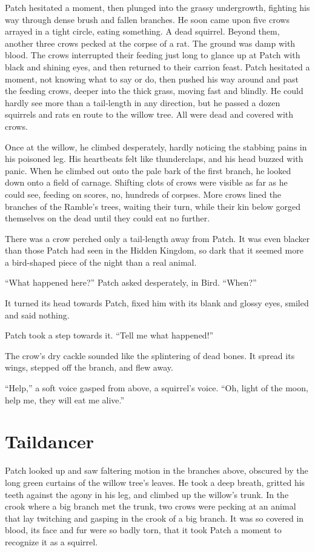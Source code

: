 \documentclass[ebook,oneside,openany,12pt]{memoir}
\begin{document}
Patch hesitated a moment, then plunged into the grassy undergrowth,
fighting his way through dense brush and fallen branches. He soon came
upon five crows arrayed in a tight circle, eating something. A dead
squirrel. Beyond them, another three crows pecked at the corpse of a
rat. The ground was damp with blood. The crows interrupted their
feeding just long to glance up at Patch with black and shining eyes,
and then returned to their carrion feast. Patch hesitated a moment,
not knowing what to say or do, then pushed his way around and past the
feeding crows, deeper into the thick grass, moving fast and
blindly. He could hardly see more than a tail-length in any direction,
but he passed a dozen squirrels and rats en route to the willow
tree. All were dead and covered with crows.

Once at the willow, he climbed desperately, hardly noticing the
stabbing pains in his poisoned leg. His heartbeats felt like
thunderclaps, and his head buzzed with panic. When he climbed out onto
the pale bark of the first branch, he looked down onto a field of
carnage. Shifting clots of crows were visible as far as he could see,
feeding on scores, no, hundreds of corpses. More crows lined the
branches of the Ramble’s trees, waiting their turn, while their kin
below gorged themselves on the dead until they could eat no further.

There was a crow perched only a tail-length away from Patch. It was
even blacker than those Patch had seen in the Hidden Kingdom, so dark
that it seemed more a bird-shaped piece of the night than a real
animal.

“What happened here?” Patch asked desperately, in Bird. “When?”

It turned its head towards Patch, fixed him with its blank and glossy
eyes, smiled and said nothing.

Patch took a step towards it. “Tell me what happened!”

The crow’s dry cackle sounded like the splintering of dead bones. It
spread its wings, stepped off the branch, and flew away.

“Help,” a soft voice gasped from above, a squirrel’s voice. “Oh, light
of the moon, help me, they will eat me alive.”


\section{Taildancer}

Patch looked up and saw faltering motion in the branches above,
obscured by the long green curtains of the willow tree’s leaves. He
took a deep breath, gritted his teeth against the agony in his leg,
and climbed up the willow’s trunk. In the crook where a big branch met
the trunk, two crows were pecking at an animal that lay twitching and
gasping in the crook of a big branch. It was so covered in blood, its
face and fur were so badly torn, that it took Patch a moment to
recognize it as a squirrel.
\end{document}
